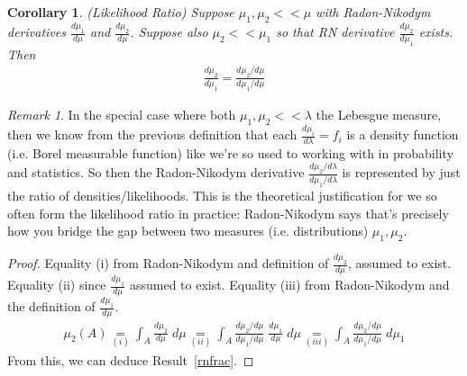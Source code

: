 \documentclass[12pt]{article}
\theoremstyle{plain}
\newtheorem{cor}[thm]{Corollary}
\theoremstyle{definition}
\theoremstyle{remark}
\newtheorem*{rmk}{Remark}
\begin{document}
\begin{cor}\emph{(Likelihood Ratio)}
\label{cor:lr}
Suppose $\mu_1,\mu_2<<\mu$ with Radon-Nikodym
derivatives $\frac{d\mu_1}{d\mu}$ and $\frac{d\mu_2}{d\mu}$.
Suppose also $\mu_2 << \mu_1$ so that RN derivative
$\frac{d\mu_2}{d\mu_1}$ exists.
Then
\begin{align}
  \frac{d\mu_2}{d\mu_1}
  = \frac{d\mu_2/d\mu}{d\mu_1/d\mu}
  \label{rnfrac}
\end{align}
\end{cor}
\begin{rmk}
In the special case where both $\mu_1,\mu_2<<\lambda$ the Lebesgue
measure, then we know from the previous definition that each
$\frac{d\mu_i}{d\lambda}=f_i$ is a density function (i.e. Borel
measurable function) like we're so used to working with in probability
and statistics. So then the Radon-Nikodym derivative
$\frac{d\mu_2/d\lambda}{d\mu_1/d\lambda}$ is represented by just the
ratio of densities/likelihoods. This is the theoretical justification
for we so often form the likelihood ratio in practice: Radon-Nikodym
says that's precisely how you bridge the gap between two measures (i.e.
distributions) $\mu_1,\mu_2$.
\end{rmk}
\begin{proof}
Equality (i) from Radon-Nikodym and definition of
$\frac{d\mu_2}{d\mu}$, assumed to exist.
Equality (ii) since $\frac{d\mu_1}{d\mu}$ assumed to exist.
Equality (iii) from Radon-Nikodym and the definition of
$\frac{d\mu_1}{d\mu}$.
\begin{align*}
  \mu_2(A)
  \underset{(i)}{=}
  \int_A \frac{d\mu_2}{d\mu} \; d\mu
  \underset{(ii)}{=}
  \int_A
  \frac{d\mu_2/d\mu}{d\mu_1/d\mu}
  \;
  \frac{d\mu_1}{d\mu}
  \; d\mu
  \underset{(iii)}{=}
  \int_A
  \frac{d\mu_2/d\mu}{d\mu_1/d\mu}
  \;d\mu_1
\end{align*}
From this, we can deduce Result~\ref{rnfrac}.
\end{proof}
\end{document}
